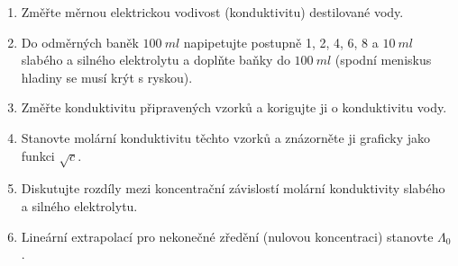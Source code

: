 \documentclass[0-protokol.tex]{subfiles}
\begin{document}
\begin{enumerate}
\item Změřte měrnou elektrickou vodivost (konduktivitu) destilované vody.
\item Do odměrných baněk $\SI{100}{ml}$ napipetujte postupně 1, 2, 4, 6, 8 a $\SI{10}{ml}$ slabého a silného elektrolytu a doplňte baňky do $\SI{100}{ml}$ (spodní meniskus hladiny se musí krýt s ryskou).
\item Změřte konduktivitu připravených vzorků a korigujte ji o konduktivitu vody.
\item Stanovte molární konduktivitu těchto vzorků a znázorněte ji graficky jako funkci $\sqrt{c}$.
\item Diskutujte rozdíly mezi koncentrační závislostí molární konduktivity slabého a silného elektrolytu.
\item Lineární extrapolací pro nekonečné zředění (nulovou koncentraci) stanovte $\Lambda_0$.
\end{enumerate}
\end{document}
